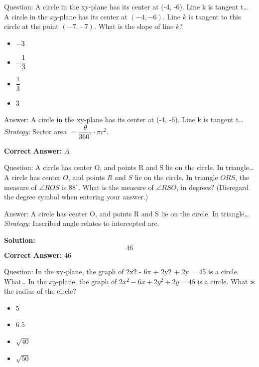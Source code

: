 \documentclass{beamer}
\begin{document}
\begin{frame}{Question: A circle in the xy-plane has its center at (-4, -6). Line k is tangent t…}
A circle in the $xy$-plane has its center at $(-4, -6)$. Line $k$ is tangent to this circle at the point $(-7, -7)$. What is the slope of line $k$?
\begin{itemize}
    \item[\textbf{A.}] $-3$
    \item[\textbf{B.}] $-\dfrac{1}{3}$
    \item[\textbf{C.}] $\dfrac{1}{3}$
    \item[\textbf{D.}] $3$
\end{itemize}
\end{frame}
\begin{frame}{Answer: A circle in the xy-plane has its center at (-4, -6). Line k is tangent t…}
\textit{Strategy:} Sector area $=\dfrac{\theta}{360^\circ}\cdot \pi r^2$.

\textbf{Correct Answer:} \( \boxed{A} \)

\end{frame}
\begin{frame}{Question: A circle has center O, and points R and S lie on the circle. In triangle…}
A circle has center $O$, and points $R$ and $S$ lie on the circle. In triangle $ORS$, the measure of $\angle ROS$ is $88^\circ$. What is the measure of $\angle RSO$, in degrees? (Disregard the degree symbol when entering your answer.)
\end{frame}
\begin{frame}{Answer: A circle has center O, and points R and S lie on the circle. In triangle…}
\textit{Strategy:} Inscribed angle relates to intercepted arc.

\textbf{Solution:}
\[ \boxed{46} \]
\textbf{Correct Answer:} \( \boxed{46} \)

\end{frame}
\begin{frame}{Question: In the xy-plane, the graph of 2x2 - 6x + 2y2 + 2y = 45 is a circle. What…}
In the $xy$-plane, the graph of $2x^2 - 6x + 2y^2 + 2y = 45$ is a circle. What is the radius of the circle?
\begin{itemize}
    \item[\textbf{A.}] $5$
    \item[\textbf{B.}] $6.5$
    \item[\textbf{C.}] $\sqrt{40}$
    \item[\textbf{D.}] $\sqrt{50}$
\end{itemize}
\end{frame}
\end{document}
